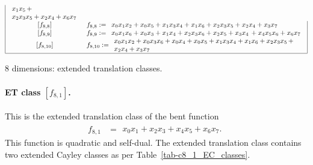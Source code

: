 \documentclass[12pt,a4paper]{article}
\begin{document}
\begin{table}[!bhpt]
\begin{align*}
\begin{array}{|cl|}
\begin{array}{l}
x_{1} x_{5}\, +
\\
x_{2} x_{3} x_{5} + x_{2} x_{4} + x_{6} x_{7}
\end{array}
\\
\,[f_{ 8 , 8 }] & f_{ 8 , 8 } :=
\begin{array}{l}
x_{0} x_{1} x_{2} + x_{0} x_{5} + x_{1} x_{3} x_{4} + x_{1} x_{6} + x_{2} x_{3} x_{5} + x_{2} x_{4}
+ x_{3} x_{7}
\end{array}
\\
\,[f_{ 8 , 9 }] & f_{ 8 , 9 } :=
\begin{array}{l}
x_{0} x_{1} x_{6} + x_{0} x_{3} + x_{1} x_{4} + x_{2} x_{3} x_{6} + x_{2} x_{5} + x_{3} x_{4}\, +
x_{4} x_{5} x_{6} + x_{6} x_{7}
\end{array}
\\
\,[f_{ 8 , 10 }] & f_{ 8 , 10 } :=
\begin{array}{l}
x_{0} x_{1} x_{2} + x_{0} x_{3} x_{6} + x_{0} x_{4} + x_{0} x_{5} + x_{1} x_{3} x_{4} + x_{1} x_{6}
+ x_{2} x_{3} x_{5}\, +
\\
x_{2} x_{4} + x_{3} x_{7}
\end{array}
\\
\hline
\end{array}
\end{align*}
\normalsize{}
\caption{8 dimensions: extended translation classes.}
\label{tab-c8_ET_classes}
\end{table}
\paragraph*{ET class $[f_{8,1}]$.}
%
This is the extended translation class of the bent function
\small{}
\begin{align*}
f_{ 8 , 1 } &=
\begin{array}{l}
x_{0} x_{1} + x_{2} x_{3} + x_{4} x_{5} + x_{6} x_{7}.
\end{array}
\end{align*}
\normalsize{}
This function is quadratic and self-dual.
The extended translation class contains two extended Cayley classes as per Table~\ref{tab-c8_1_EC_classes}.
\end{document}
